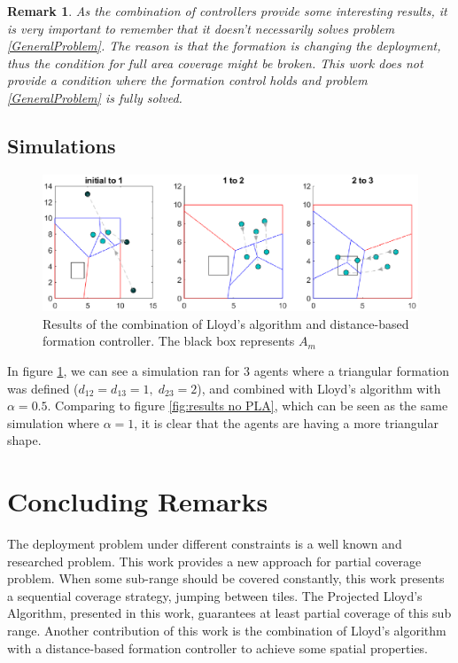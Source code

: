 \documentclass{iacas}
\newtheorem{remark}{Remark}
\begin{document}

\begin{remark}As the combination of controllers provide some interesting results, it is very important to remember that it doesn't necessarily solves problem \ref{GeneralProblem}. The reason is that the formation is changing the deployment, thus the condition for full area coverage might be broken. This work \emph{does not} provide a condition where the formation control holds \emph{and} problem \ref{GeneralProblem} is fully solved.
\end{remark}
\subsection{Simulations}

\begin{figure}[H]
\includegraphics[scale=0.8]{figures/proposed-sol/results/sim3-3agents-3partitions-noPLA-formation.eps}
\caption{Results of the combination of Lloyd's algorithm and distance-based formation controller. The black box represents $A_m$}
\label{fig:results formation, no PLA}
\end{figure}

In figure \ref{fig:results formation, no PLA}, we can see a simulation ran for 3 agents where a triangular formation was defined ($d_{12} = d_{13} = 1,\; d_{23} = 2$), and combined with Lloyd's algorithm with $\alpha = 0.5$. Comparing to figure \ref{fig:results no PLA}, which can be seen as the same simulation where $\alpha = 1$, it is clear that the agents are having a more triangular shape.

\section{Concluding Remarks}
The deployment problem under different constraints is a well known and researched problem. This work provides a new approach for partial coverage problem. When some sub-range should be covered constantly, this work presents a sequential coverage strategy, jumping between tiles. The Projected Lloyd's Algorithm, presented in this work, guarantees at least partial coverage of this sub range. Another contribution of this work is the combination of Lloyd's algorithm with a distance-based formation controller to achieve some spatial properties.
\end{document}
